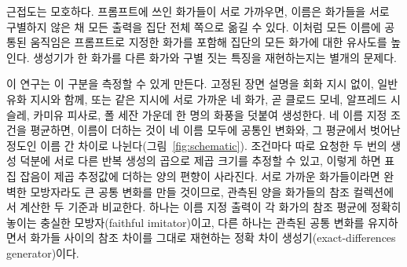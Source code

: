 \documentclass[10pt]{article}
\newcommand{\term}[1]{\textsf{#1}}
\begin{document}
근접도는 모호하다. 프롬프트에 쓰인 화가들이 서로 가까우면, 이름은 화가들을 서로 구별하지 않은 채 모든
출력을 집단 전체 쪽으로 옮길 수 있다. 이처럼 모든 이름에 공통된 움직임은 프롬프트로 지정한 화가를
포함해 집단의 모든 화가에 대한 유사도를 높인다. 생성기가 한 화가를 다른 화가와 구별 짓는 특징을
재현하는지는 별개의 문제다.

이 연구는 이 구분을 측정할 수 있게 만든다. 고정된 장면 설명을 회화 지시 없이, 일반 유화 지시와 함께,
또는 같은 지시에 서로 가까운 네 화가, 곧 클로드 모네, 알프레드 시슬레, 카미유 피사로, 폴 세잔 가운데 한
명의 화풍을 덧붙여 생성한다. 네 이름 지정 조건을 평균하면, 이름이 더하는 것이 네 이름 모두에 공통인
변화와, 그 평균에서 벗어난 정도인 이름 간 차이로 나뉜다(그림~\ref{fig:schematic}). 조건마다 따로 요청한
두 번의 생성 덕분에 서로 다른 반복 생성의 곱으로 제곱 크기를 추정할 수 있고, 이렇게 하면 표집 잡음이
제곱 추정값에 더하는 양의 편향이 사라진다. 서로 가까운 화가들이라면 완벽한 모방자라도 큰 공통 변화를
만들 것이므로, 관측된 양을 화가들의 참조 컬렉션에서 계산한 두 기준과 비교한다. 하나는 이름 지정 출력이
각 화가의 참조 평균에 정확히 놓이는 \term{충실한 모방자}(faithful imitator)이고, 다른 하나는 관측된 공통
변화를 유지하면서 화가들 사이의 참조 차이를 그대로 재현하는 \term{정확 차이 생성기}(exact-differences
generator)이다.
\end{document}
